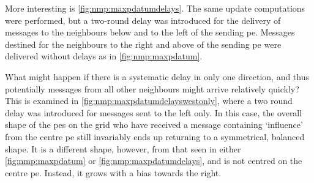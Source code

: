 More interesting is \autoref{fig:nmp:maxpdatumdelays}.  The same update computations were performed, but a two-round delay was introduced for the delivery of messages to the neighbours below and to the left of the sending \gls{pe}.  Messages destined for the neighbours to the right and above of the sending \gls{pe} were delivered without delays as in \autoref{fig:nmp:maxpdatum}.

What might happen if there is a systematic delay in only one direction, and thus potentially messages from all other neighbours might arrive relatively quickly?  This is examined in \autoref{fig:nmp:maxpdatumdelayswestonly}, where a two round delay was introduced for messages sent to the left only.  In this case, the overall shape of the \glspl{pe} on the grid who have received a message containing `influence' from the centre \gls{pe} still invariably ends up returning to a symmetrical, balanced shape.  It is a different shape, however, from that seen in either \autoref{fig:nmp:maxpdatum} or \autoref{fig:nmp:maxpdatumdelays}, and is not centred on the centre \gls{pe}.  Instead, it grows with a bias towards the right.

